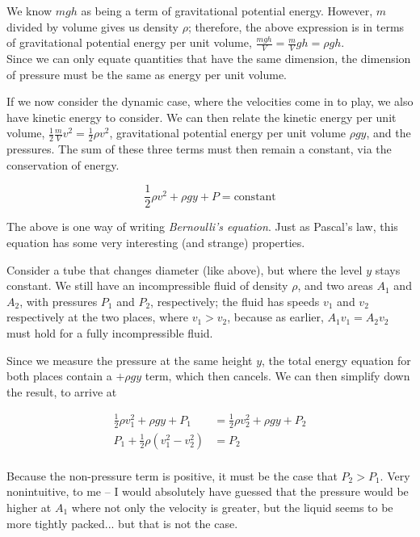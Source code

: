 We know $m g h$ as being a term of gravitational potential energy. However, $m$ divided by volume gives us density $\rho$; therefore, the above expression is in terms of gravitational potential energy per unit volume, $\displaystyle \frac{m g h}{V} = \frac{m}{V} g h = \rho g h$.\\
Since we can only equate quantities that have the same dimension, the dimension of pressure must be the same as energy per unit volume.

If we now consider the dynamic case, where the velocities come in to play, we also have kinetic energy to consider. We can then relate the kinetic energy per unit volume, $\displaystyle \frac{1}{2} \frac{m}{V} v^2 = \frac{1}{2} \rho v^2$, gravitational potential energy per unit volume $\rho g y$, and the pressures. The sum of these three terms must then remain a constant, via the conservation of energy.

\begin{equation}
\frac{1}{2} \rho v^2 + \rho g y + P = \text{constant}
\end{equation}

The above is one way of writing \emph{Bernoulli's equation}. Just as Pascal's law, this equation has some very interesting (and strange) properties.

Consider a tube that changes diameter (like above), but where the level $y$ stays constant. We still have an incompressible fluid of density $\rho$, and two areas $A_1$ and $A_2$, with pressures $P_1$ and $P_2$, respectively; the fluid has speeds $v_1$ and $v_2$ respectively at the two places, where $v_1 > v_2$, because as earlier, $A_1 v_1 = A_2 v_2$ must hold for a fully incompressible fluid.

Since we measure the pressure at the same height $y$, the total energy equation for both places contain a $+ \rho g y$ term, which then cancels. We can then simplify down the result, to arrive at

\begin{align}
\frac{1}{2} \rho v_1^2 + \rho g y + P_1 &= \frac{1}{2} \rho v_2^2 + \rho g y + P_2\\
P_1 + \frac{1}{2} \rho (v_1^2 - v_2^2) &= P_2\\
\end{align}

Because the non-pressure term is positive, it must be the case that $P_2 > P_1$. Very nonintuitive, to me -- I would absolutely have guessed that the pressure would be higher at $A_1$ where not only the velocity is greater, but the liquid seems to be more tightly packed... but that is not the case.

